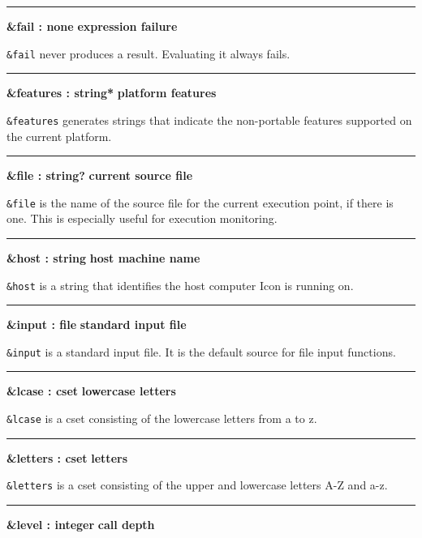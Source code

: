 \bigskip\hrule\vspace{0.1cm}
\noindent
{\bf \&fail : none } \hfill {\bf expression failure}

\noindent
{}\texttt{\&fail} never produces a
result. Evaluating it always fails.

\bigskip\hrule\vspace{0.1cm}
\noindent
{\bf \&features : string* } \hfill {\bf platform features}

\noindent
{}\texttt{\&features} generates strings that indicate the
non-portable features supported on the current platform.

\bigskip\hrule\vspace{0.1cm}
\noindent
{\bf \&file : string? } \hfill {\bf current source file}

\noindent
\texttt{\&file} is the name of the source file for
the current execution point, if there is one. This is especially useful
for execution monitoring.

\bigskip\hrule\vspace{0.1cm}
\noindent
{\bf \&host : string } \hfill {\bf host machine name}

\noindent
{}\texttt{\&host} is a string that
identifies the host computer Icon is running on.

\bigskip\hrule\vspace{0.1cm}
\noindent
{\bf \&input : file } \hfill {\bf standard input file}

\noindent
{}\texttt{\&input} is a standard input
file. It is the default source for file input functions.

\bigskip\hrule\vspace{0.1cm}
\noindent
{\bf \&lcase : cset } \hfill {\bf lowercase letters}

\noindent
{}\texttt{\&lcase} is a cset consisting of
the lowercase letters from a to z.

\bigskip\hrule\vspace{0.1cm}
\noindent
{\bf \&letters : cset } \hfill {\bf letters}

\noindent
{}\texttt{\&letters} is a cset consisting
of the upper and lowercase letters A-Z and a-z.

\bigskip\hrule\vspace{0.1cm}
\noindent
{\bf \&level : integer } \hfill {\bf call depth}


